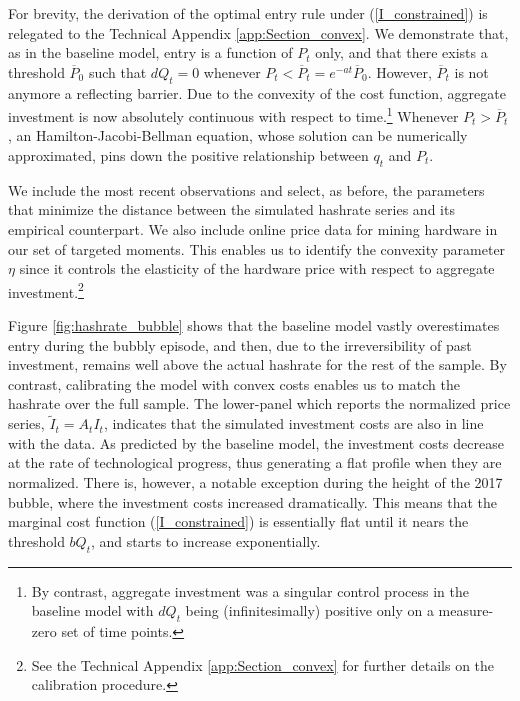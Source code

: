 \documentclass[12pt, a4paper]{article}
\begin{document}
For brevity, the derivation of the optimal entry rule under (\ref{I_constrained}) is relegated to the Technical Appendix \ref{app:Section_convex}.
We demonstrate that, as in the baseline model, entry is a function of $P_t$ only, and that there exists
a threshold $\overline{P}_0$ such that $dQ_t=0$ whenever $P_t<\overline{P}_t=e^{-at}\overline{P}_0$.
However, $\overline{P}_t$ is not anymore
a reflecting barrier. Due to the convexity of the cost function, aggregate investment is now absolutely
continuous with respect to time.\footnote{By contrast, aggregate investment was a singular control process in the baseline model
with $dQ_t$ being (infinitesimally) positive only on a measure-zero set of time points.} Whenever $P_t>\overline{P}_t$,
an Hamilton-Jacobi-Bellman equation, whose solution can be numerically approximated, pins down the positive relationship between
$q_t$ and $P_t$.

We include the most recent observations and select, as before, the parameters that minimize the distance
between the simulated hashrate series and its empirical counterpart. We also include online price data for mining hardware
in our set of targeted moments. This enables us to identify the convexity parameter $\eta$ since
it controls the elasticity of the hardware price with respect to aggregate investment.\footnote{See
the Technical Appendix \ref{app:Section_convex} for further details on the calibration procedure.}

Figure \ref{fig:hashrate_bubble} shows that the baseline model
vastly overestimates entry during the bubbly episode, and then,
due to the irreversibility of past investment, remains well above the actual hashrate for the rest of the sample.
By contrast, calibrating the model with convex costs
enables us to match the hashrate over the full sample. The lower-panel which
reports the normalized price series, $\tilde{I}_t= A_t{I}_t$, indicates
that the simulated investment costs are also in line with the data.
As predicted by the baseline model, the investment costs
decrease at the rate of technological progress, thus generating
a flat profile when they are normalized. There is, however, a notable exception
during the height of the 2017 bubble, where the investment costs increased dramatically.
This means that the
marginal cost function (\ref{I_constrained}) is essentially flat until it nears the threshold $bQ_t$,
and starts to increase exponentially.
\end{document}
